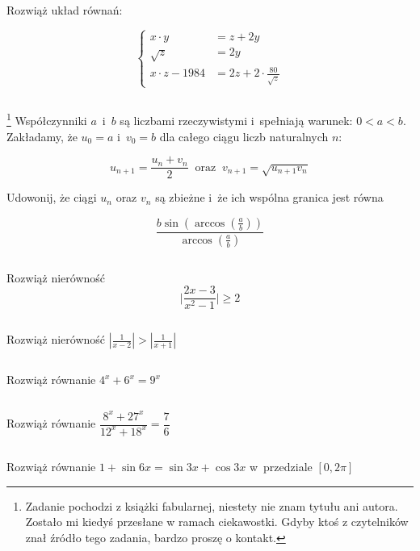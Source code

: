 $ $

\begin{zada}
Rozwiąż układ równań:

\[ \begin{cases}
x \cdot y &= z + 2y  \\
\sqrt{z} &= 2y \\
x \cdot z - 1984 &= 2z + 2 \cdot \frac{80}{\sqrt{z}} 
\end{cases} \]

\end{zada}

$ $

\begin{zada} \footnote{Zadanie pochodzi z książki fabularnej, niestety nie znam tytułu ani autora. Zostało mi kiedyś przesłane w ramach ciekawostki. Gdyby ktoś z czytelników znał źródło tego zadania, bardzo proszę o kontakt.}
Współczynniki $a$~i~$b$ są liczbami rzeczywistymi i~spełniają warunek: $0<a<b.$ Zakładamy, że $u_{0}=a$ i~$v_{0}=b$ dla całego ciągu liczb naturalnych $n$:

\[ u_{n+1}=\frac{u_{n}+v_{n}}{2} \ \textrm{ oraz } \ v_{n+1}=\sqrt{u_{n+1}v_{n}}\]

Udowonij, że ciągi $u_{n}$ oraz $v_{n}$ są zbieżne i~że ich wspólna granica jest równa

\[ \frac{b\sin(\arccos(\frac{a}{b}))}{\arccos(\frac{a}{b})} \]
\end{zada}

$ $

\begin{zada} %
Rozwiąż nierówność
\[ \Big|\frac{2x-3}{x^2-1}\Big| \geq 2 \]
\end{zada}

$ $

\begin{zada}
Rozwiąż nierówność $|\frac{1}{x-2}|>|\frac{1}{x+1}|$
\end{zada}

$ $

\begin{zada}
Rozwiąż równanie $4^x + 6^x = 9^x$
\end{zada}

$ $

\begin{zada}
Rozwiąż równanie $\dfrac{8^x+27^x}{12^x+18^x}=\dfrac{7}{6}$
\end{zada}

$ $

\begin{zada}
Rozwiąż równanie $1+\sin6x = \sin3x + \cos3x$ w~przedziale $[0,2\pi]$
\end{zada}


